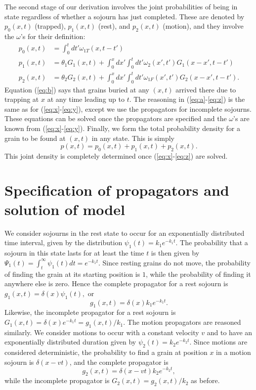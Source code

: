 \documentclass[]{agujournal2018}
\newcommand\be{\begin{equation}}
\newcommand\ee{\end{equation}}
\begin{document}
The second stage of our derivation involves the joint probabilities of being in state regardless of whether a sojourn has just completed. These are denoted by  $p_0(x,t)$ (trapped), $p_1(x,t)$ (rest), and $p_2(x,t)$ (motion), and they involve the $\omega$'s for their definition:
\begin{align}
p_0(x,t) &= \int_0^t dt' \omega_{1T}(x,t-t') \label{eq:b}\\
p_1(x,t) &= \theta_1 G_1(x,t) + \int_0^x dx' \int_0^t dt' \omega_2(x',t')G_1(x-x',t-t')\label{eq:a}\\
p_2(x,t) &= \theta_2 G_2(x,t) + \int_0^x dx' \int_0^t dt'  \omega_{1F}(x',t')G_2(x-x',t-t').\label{eq:z}
\end{align}
Equation (\ref{eq:b}) says that grains buried at any $(x,t)$ arrived there due to trapping at $x$ at any time leading up to $t$.
The reasoning in (\ref{eq:a}-\ref{eq:z}) is the same as for (\ref{eq:x}-\ref{eq:y}), except we use the propagators for incomplete sojourns.
These equations can be solved once the propagators are specified and the $\omega$'s are known from (\ref{eq:x}-\ref{eq:y}).
Finally, we form the total probability density for a grain to be found at $(x,t)$ in any state.
This is simply 
\be p(x,t) = p_0(x,t) + p_1(x,t) + p_2(x,t). \label{eq:dist}\ee
This joint density is completely determined once (\ref{eq:x}-\ref{eq:z}) are solved.


\section{Specification of propagators and solution of model}
\label{sec:solution}
We consider sojourns in the rest state to occur for an exponentially distributed time interval, given by the distribution $\psi_1(t) = k_1 e^{-k_1t}.$
The probability that a sojourn in this state lasts for at least the time $t$ is then given by $\Psi_1(t) = \int_t^\infty \psi_1(t)dt = e^{-k_1 t}$.
Since resting grains do not move, the probability of finding the grain at its starting position is $1$, while the probability of finding it anywhere else is zero.
Hence the complete propagator for a rest sojourn is $g_1(x,t) = \delta(x)\psi_1(t),$ or 
\be g_1(x,t) = \delta(x)k_1e^{-k_1t}.\label{eq:prop1} \ee
Likewise, the incomplete propagator for a rest sojourn is $G_1(x,t) = \delta(x)e^{-k_1t} = g_1(x,t)/k_1.$
The motion propagators are reasoned similarly.
We consider motions to occur with a constant velocity $v$ and to have an exponentially distributed duration given by $\psi_2(t) = k_2 e^{-k_2t}.$
Since motions are considered deterministic, the probability to find a grain at position $x$ in a motion sojourn is $\delta(x-vt)$, and the complete propagator is 
\be g_2(x,t) = \delta(x-vt)k_2e^{-k_2t},\label{eq:prop2}\ee
while the incomplete propagator is $G_2(x,t) = g_2(x,t)/k_2$ as before.
\end{document}
